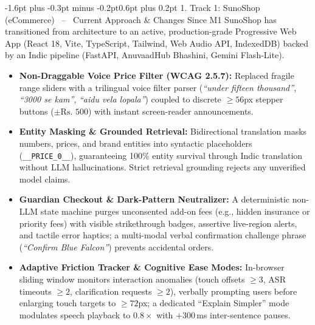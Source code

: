\documentclass[10pt,a4paper]{article}
\makeatletter
\renewcommand{\section}{\@startsection{section}{1}{\z@}%
  {-1.6pt plus -0.3pt minus -0.2pt}{0.6pt plus 0.2pt}%
  {\normalfont\footnotesize\bfseries\scshape}}
\makeatother
\begin{document}
\section{1. Track 1: SunoShop (eCommerce) \ -- \ Current Approach \& Changes Since M1}
SunoShop has transitioned from architecture to an active, production-grade Progressive Web App (React 18, Vite, TypeScript, Tailwind, Web Audio API, IndexedDB) backed by an Indic pipeline (FastAPI, AnuvaadHub Bhashini, Gemini Flash-Lite).
\begin{itemize}\setlength{\itemsep}{0.2pt}\setlength{\topsep}{0.2pt}\setlength{\leftmargin}{1.1em}
  \item \textbf{Non-Draggable Voice Price Filter (WCAG 2.5.7):} Replaced fragile range sliders with a trilingual voice filter parser (\textit{``under fifteen thousand''}, \textit{``3000 se kam''}, \textit{``aidu vela lopala''}) coupled to discrete $\ge 56$px stepper buttons ($\pm\text{Rs.~}500$) with instant screen-reader announcements.
  \item \textbf{Entity Masking \& Grounded Retrieval:} Bidirectional translation masks numbers, prices, and brand entities into syntactic placeholders (\texttt{\_\_PRICE\_0\_\_}), guaranteeing 100\% entity survival through Indic translation without LLM hallucinations. Strict retrieval grounding rejects any unverified model claims.
  \item \textbf{Guardian Checkout \& Dark-Pattern Neutralizer:} A deterministic non-LLM state machine purges unconsented add-on fees (e.g., hidden insurance or priority fees) with visible strikethrough badges, assertive live-region alerts, and tactile error haptics; a multi-modal verbal confirmation challenge phrase (\textit{``Confirm Blue Falcon''}) prevents accidental orders.
  \item \textbf{Adaptive Friction Tracker \& Cognitive Ease Modes:} In-browser sliding window monitors interaction anomalies (touch offsets $\ge 3$, ASR timeouts $\ge 2$, clarification requests $\ge 2$), verbally prompting users before enlarging touch targets to $\ge 72$px; a dedicated ``Explain Simpler'' mode modulates speech playback to $0.8\times$ with $+300$\,ms inter-sentence pauses.
\end{itemize}

\vspace{-2pt}
\end{document}
